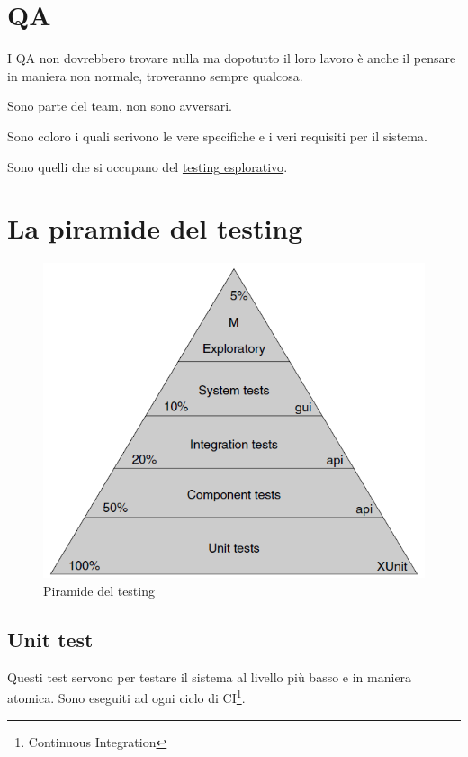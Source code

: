 \documentclass[11pt,a4paper]{book}
\begin{document}
\section{QA}
I QA non dovrebbero trovare nulla ma dopotutto il loro lavoro è anche il pensare in maniera non normale, troveranno sempre qualcosa.

Sono parte del team, non sono avversari.

Sono coloro i quali scrivono le vere specifiche e i veri requisiti per il sistema.

Sono quelli che si occupano del \href{http://www.satisfice.com/articles/what_is_et.shtml}{testing esplorativo}.

\section{La piramide del testing}
\begin{figure}[h!]
	\begin{center}
		\includegraphics[scale=0.6]{img/003.png}
		\caption{Piramide del testing}
		\label{fig: 003}
	\end{center}
\end{figure}

\subsection{Unit test}
Questi test servono per testare il sistema al livello più basso e in maniera atomica. Sono eseguiti ad ogni ciclo di CI\footnote{Continuous Integration}.
\end{document}
